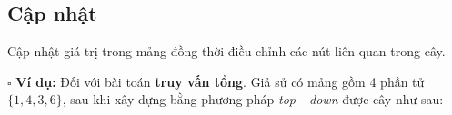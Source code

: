 \documentclass[a4paper]{article}
\begin{document}
\begin{table}[tbh!]
\begin{minipage}[c]{0.5in}
\begin{center}
\begin{tikzpicture}
            \end{tikzpicture}
        \end{center}
    \end{minipage}
    \begin{minipage}[t]{1.6in}    
    \end{minipage}
\end{table}

\subsection{Cập nhật}
\hspace{0.5cm}Cập nhật giá trị trong mảng đồng thời điều chỉnh các nút liên quan trong cây.\medskip

\noindent $\square$ \textbf{Ví dụ:} Đối với bài toán \textbf{truy vấn tổng}. Giả sử có mảng gồm 4 phần tử $\{1,4,3,6\}$, sau khi xây dựng bằng phương pháp \textit{top - down} được cây như sau:
\end{document}
